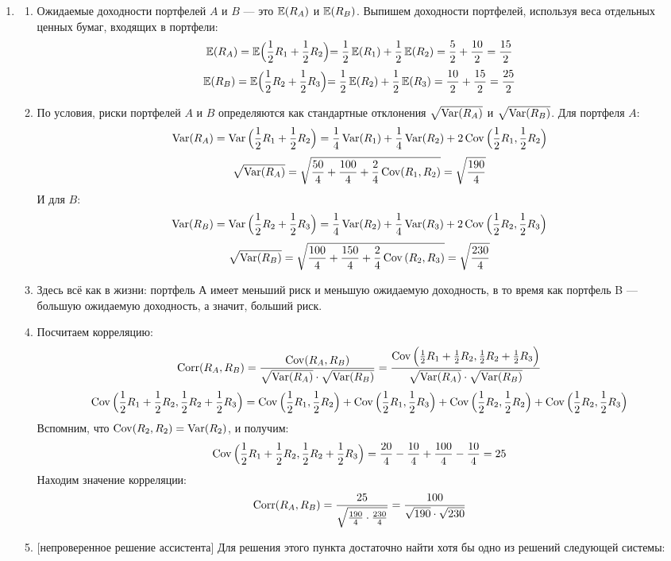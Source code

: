 \begin{enumerate}
\item
\begin{enumerate}
	\item Ожидаемые доходности портфелей $A$ и $B$ — это $\operatorname{\mathbb{E}}(R_A)$ и $\operatorname{\mathbb{E}}(R_B)$. 
	Выпишем доходности портфелей, используя веса отдельных ценных бумаг, входящих в портфели:
	\[
		\operatorname{\mathbb{E}}(R_A) = \operatorname{\mathbb{E}}\Bigr(\frac{1}{2}R_1+\frac{1}{2}R_2\Bigl) = \frac{1}{2}\operatorname{\mathbb{E}}(R_1) + \frac{1}{2}\operatorname{\mathbb{E}}(R_2) = \frac{5}{2} + \frac{10}{2} = \frac{15}{2}
	\]
	\[
		\operatorname{\mathbb{E}}(R_B) = \operatorname{\mathbb{E}}\Bigr(\frac{1}{2}R_2+\frac{1}{2}R_3\Bigl) = \frac{1}{2}\operatorname{\mathbb{E}}(R_2) + \frac{1}{2}\operatorname{\mathbb{E}}(R_3) = \frac{10}{2} + \frac{15}{2} = \frac{25}{2}
	\]
	\item По условия, риски портфелей $A$ и $B$ определяются как стандартные отклонения $\sqrt{\operatorname{Var}(R_A)}$ и $\sqrt{\operatorname{Var}(R_B)}$. 
	Для портфеля $A$:
	\[
		\operatorname{Var}(R_A) = \operatorname{Var}{\Bigr(\frac{1}{2}R_1 + \frac{1}{2}R_2\Bigl)} = \frac{1}{4}\operatorname{Var}(R_1) + \frac{1}{4}\operatorname{Var}(R_2) + 2\operatorname{Cov}{\Bigr(\frac{1}{2}R_1, \frac{1}{2}R_2\Bigl)} 
	\]
	\[
		\sqrt{\operatorname{Var}(R_A)} =  \sqrt{\frac{50}{4} + \frac{100}{4} + \frac{2}{4}\operatorname{Cov}(R_1, R_2)} = \sqrt{\frac{190}{4}}
	\]
	И для $B$:
	\[
		\operatorname{Var}(R_B) = \operatorname{Var}{\Bigr(\frac{1}{2}R_2 + \frac{1}{2}R_3\Bigl)} = \frac{1}{4}\operatorname{Var}(R_2) + \frac{1}{4}\operatorname{Var}(R_3) + 2\operatorname{Cov}{\Bigr(\frac{1}{2}R_2, \frac{1}{2}R_3\Bigl)} 
	\]
	\[
		\sqrt{\operatorname{Var}(R_B)} =  \sqrt{\frac{100}{4} + \frac{150}{4} + \frac{2}{4}\operatorname{Cov}{(R_2, R_3)}} = \sqrt{\frac{230}{4}}
	\]
	\item Здесь всё как в жизни:
	портфель А имеет меньший риск и меньшую ожидаемую доходность, в то время как портфель B — большую ожидаемую доходность, а значит, больший риск.
	\item Посчитаем корреляцию:
	\[
		\operatorname{Corr}(R_A, R_B) = \frac{\operatorname{Cov}(R_A, R_B)}{\sqrt{\operatorname{Var}(R_A)}\cdot \sqrt{\operatorname{Var}(R_B)}} = 
		\frac{\operatorname{Cov}{\Bigr(\frac{1}{2}R_1 + \frac{1}{2}R_2,\frac{1}{2}R_2 + \frac{1}{2}R_3\Bigl)}}{\sqrt{\operatorname{Var}(R_A)}\cdot \sqrt{\operatorname{Var}(R_B)}} 
	\]
	\[
		\operatorname{Cov}{\Bigr(\frac{1}{2}R_1 + \frac{1}{2}R_2,\frac{1}{2}R_2 + \frac{1}{2}R_3\Bigl)} = 
		\operatorname{Cov}{\Bigr(\frac{1}{2}R_1,\frac{1}{2}R_2\Bigl)} + \operatorname{Cov}{\Bigr(\frac{1}{2}R_1, \frac{1}{2}R_3\Bigl)} + \operatorname{Cov}{\Bigr(\frac{1}{2}R_2,\frac{1}{2}R_2\Bigl)} + \operatorname{Cov}{\Bigr(\frac{1}{2}R_2, \frac{1}{2}R_3\Bigl)}
	\]
	Вспомним, что $\operatorname{Cov}(R_2,R_2) = \operatorname{Var}(R_2)$, и получим:
	\[
		\operatorname{Cov}{\Bigr(\frac{1}{2}R_1 + \frac{1}{2}R_2,\frac{1}{2}R_2 + \frac{1}{2}R_3\Bigl)} = \frac{20}{4} - \frac{10}{4} + \frac{100}{4} - \frac{10}{4} = 25
	\]
	Находим значение корреляции:
	\[
		\operatorname{Corr}(R_A, R_B) = \frac{25}{\sqrt{\frac{190}{4}\cdot \frac{230}{4}}} = \frac{100}{\sqrt{190} \cdot \sqrt{230}}
	\]
	\item {[непроверенное решение ассистента]} Для решения этого пункта достаточно найти хотя бы одно из решений следующей системы:

\end{enumerate}
\end{enumerate}

